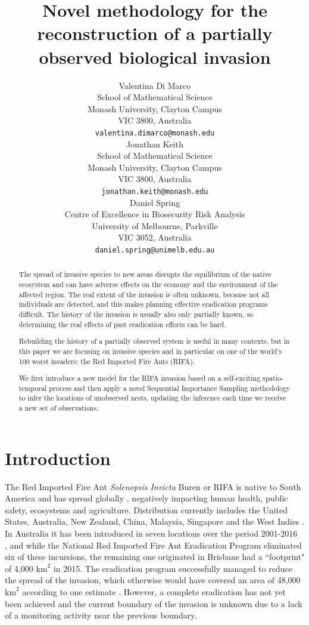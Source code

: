 \documentclass{article}
\title{Novel methodology for the reconstruction of a partially observed biological invasion}
\author{
 Valentina Di Marco  \\
  School of Mathematical Science\\
  Monash University, Clayton Campus\\
  VIC 3800, Australia \\
  \texttt{valentina.dimarco@monash.edu} \\
  \And
 Jonathan Keith \\
  School of Mathematical Science\\
  Monash University, Clayton Campus\\
  VIC 3800, Australia \\
  \texttt{jonathan.keith@monash.edu} \\
  \And
 Daniel Spring  \\
  Centre of Excellence in Biosecurity Risk Analysis\\
  University of Melbourne, Parkville\\
  VIC 3052, Australia \\
  \texttt{daniel.spring@unimelb.edu.au} \\
}
\begin{document}
\maketitle

\begin{abstract}
    The spread of invasive species to new areas disrupts the equilibrium of the native ecosystem and can have adverse effects on the economy and the environment of the affected region. The real extent of the invasion is often unknown, because not all individuals are detected, and this makes planning effective eradication programs difficult. The history of the invasion is usually also only partially known, so determining the real effects of past eradication efforts can be hard. 

    Rebuilding the history of a partially observed system is useful in many contexts, but in this paper we are focusing on invasive species and in particular on one of the world's 100 worst invaders: the Red Imported Fire Ants (RIFA). 

    We first introduce a new model for the RIFA invasion based on a self-exciting spatio-temporal process and then apply a novel Sequential Importance Sampling methodology to infer the locations of unobserved nests, updating the inference each time we receive a new set of observations.
\end{abstract}


\section{Introduction}\label{section:introduction}
The Red Imported Fire Ant \textit{Solenopsis Invicta} Buren \cite{GISD} or RIFA is native to South America and has spread globally \cite{Wetterer}, negatively impacting human health, public safety, ecosystems and agriculture. Distribution currently includes the United States, Australia, New Zealand, China, Malaysia, Singapore and the West Indies \cite{Wang} \cite{GISD}. In Australia it has been introduced in seven locations over the period 2001-2016 \\ \cite{WylieMay16}, and while the National Red Imported Fire Ant Eradication Program eliminated six of these incursions, the remaining one originated in Brisbane had a ``footprint" of 4,000 $\text{km}^2$ in 2015. The eradication program successfully managed to reduce the spread of the invasion, which otherwise would have covered an area of 48,000 $\text{km}^2$ according to one estimate \cite{Wylie2020}. However, a complete eradication has not yet been achieved and the current boundary of the invasion is unknown due to a lack of a monitoring activity near the previous boundary.
\end{document}
